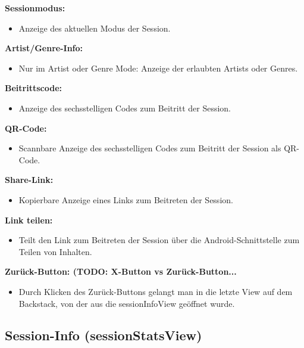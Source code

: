\documentclass[oneside, ngerman]{sdqtechreport}
\begin{document}
\textbf{Sessionmodus:}
\begin{itemize}
    \item Anzeige des aktuellen Modus der Session.
\end{itemize}

\textbf{Artist/Genre-Info:}
\begin{itemize}
    \item Nur im Artist oder Genre Mode: Anzeige der erlaubten Artists oder Genres.
\end{itemize}

\textbf{Beitrittscode:}
\begin{itemize}
    \item Anzeige des sechsstelligen Codes zum Beitritt der Session.
\end{itemize}

\textbf{QR-Code:}
\begin{itemize}
    \item Scannbare Anzeige des sechsstelligen Codes zum Beitritt der Session als QR-Code.
\end{itemize}

\textbf{Share-Link:}
\begin{itemize}
    \item Kopierbare Anzeige eines Links zum Beitreten der Session.
\end{itemize}

\textbf{Link teilen:}
\begin{itemize}
    \item Teilt den Link zum Beitreten der Session über die Android-Schnittstelle zum Teilen von Inhalten.
\end{itemize}

\textbf{Zurück-Button: (TODO: X-Button vs Zurück-Button...}
\begin{itemize}
    \item Durch Klicken des Zurück-Buttons gelangt man in die letzte View auf dem Backstack, von der aus die sessionInfoView geöffnet wurde.
\end{itemize}


\subsection{Session-Info (sessionStatsView)}
\label{sec:Benutzeroberfläche:sessionStatsView}
\end{document}

